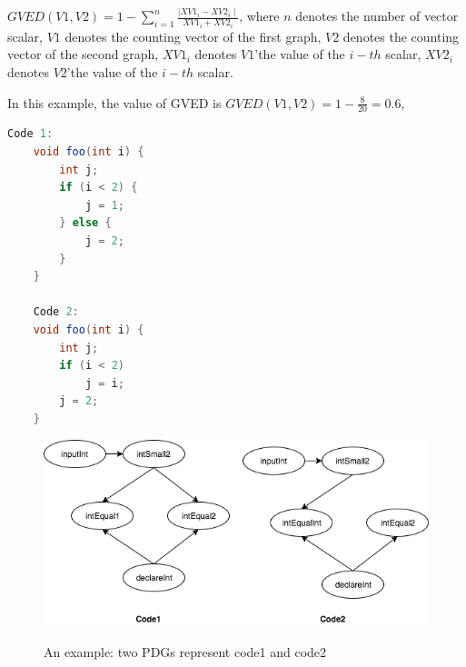 $GVED \left( V1, V2 \right) = 1 - \sum_{i=1}^{n} \frac{ \mid XV1_i - XV2_i \mid}{XV1_i + XV2_i}$, 
where $n$ denotes the number of vector scalar, $V1$ denotes the counting vector of the first graph, $V2$ denotes the counting vector of the second graph, $XV1_i$ denotes $V1$\rq the value of the $i-th$ scalar, $XV2_i$ denotes $V2$\rq the value of the $i-th$ scalar.  

In this example, the value of GVED is $GVED\left(V1, V2\right) = 1 - \frac{8 }{20} = 0.6 $,


\begin{lstlisting}[language=JAVA]
	Code 1:
	void foo(int i) {
		int j;
		if (i < 2) {
			j = 1;
		} else {
			j = 2;
		}
	}

	Code 2:
	void foo(int i) {
		int j;
		if (i < 2) 
			j = i;	 
		j = 2;
	}
\end{lstlisting}
\begin{figure}[h]
	\caption{An example: two PDGs represent code1 and code2}
	\includegraphics[scale=0.4]{img/Diagram_PDG.png}
	\centering
	\label{fig:PDGs}
\end{figure}

\begin{table}[htbp]
  \centering
  \caption{Feature table of code1 extracted in Exas}
  \label{tab:feature1}%
\end{table}%

